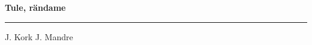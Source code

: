 \documentclass[10pt]{book}
\begin{document}
{
  \samepage
  \raggedbottom
  \raggedright
  \sloppy


  \vspace{0.2in}

  \noindent\begin{minipage}{.1\textwidth}
    \hfill\vspace{0.1in}
  \end{minipage}%
  \noindent\begin{minipage}{.8\textwidth}
    \centering
    \bfseries
    \large Tule, r\"andame
  \end{minipage}%
  \noindent\begin{minipage}{.1\textwidth}
      \hfill\vspace{0.1in}
  \end{minipage}

  \nopagebreak[4]
  \vspace{0.1in}
  \nopagebreak[4]
  \hrule height 0.05ex
  \nopagebreak[4]
  \vspace{-0.05in}

  {\footnotesize J. Kork \hfill J. Mandre }\\
  \vspace{0.01in}


  \vspace{0.01in}
  \nopagebreak[4]
  {%
\parindent 0pt
\noindent
\ifx\preLilyPondExample \undefined
\else
  \expandafter\preLilyPondExample
\fi
\def\lilypondbook{}%

\ifx\postLilyPondExample \undefined
\else
  \expandafter\postLilyPondExample
\fi
}

}
\end{document}
